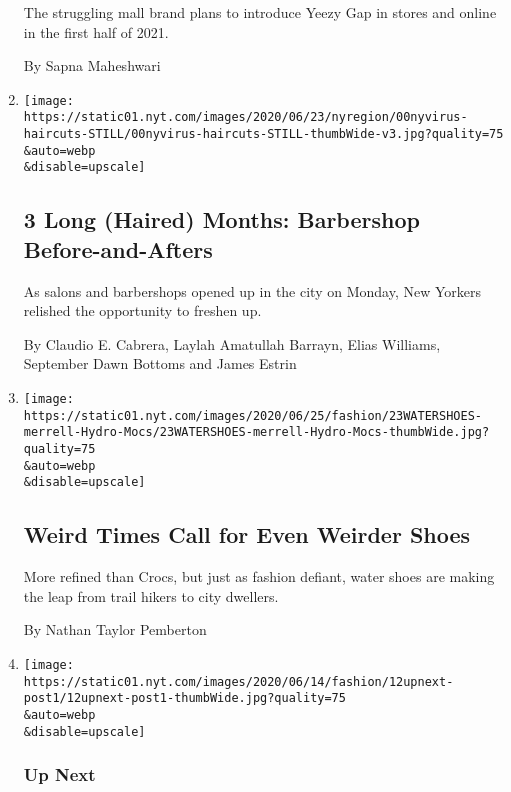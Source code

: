 \begin{enumerate}
  The struggling mall brand plans to introduce Yeezy Gap in stores and
  online in the first half of 2021.

  By Sapna Maheshwari
\item
  \href{/2020/06/25/nyregion/nyc-barber-shops-coronavirus.html}{}

  \texttt{[image: https://static01.nyt.com/images/2020/06/23/nyregion/00nyvirus-haircuts-STILL/00nyvirus-haircuts-STILL-thumbWide-v3.jpg?quality=75\\\&auto=webp\\\&disable=upscale]}

  \hypertarget{3-long-haired-months-barbershop-before-and-afters}{%
  \subsection{3 Long (Haired) Months: Barbershop
  Before-and-Afters}\label{3-long-haired-months-barbershop-before-and-afters}}

  As salons and barbershops opened up in the city on Monday, New Yorkers
  relished the opportunity to freshen up.

  By Claudio E. Cabrera, Laylah Amatullah Barrayn, Elias Williams,
  September Dawn Bottoms and James Estrin
\item
  \href{/2020/06/24/style/weird-times-call-for-even-weirder-shoes.html}{}

  \texttt{[image: https://static01.nyt.com/images/2020/06/25/fashion/23WATERSHOES-merrell-Hydro-Mocs/23WATERSHOES-merrell-Hydro-Mocs-thumbWide.jpg?quality=75\\\&auto=webp\\\&disable=upscale]}

  \hypertarget{weird-times-call-for-even-weirder-shoes}{%
  \subsection{Weird Times Call for Even Weirder
  Shoes}\label{weird-times-call-for-even-weirder-shoes}}

  More refined than Crocs, but just as fashion defiant, water shoes are
  making the leap from trail hikers to city dwellers.

  By Nathan Taylor Pemberton
\item
  \href{/2020/06/12/style/a-street-wear-designer-who-graduated-from-yeezy-university.html}{}

  \texttt{[image: https://static01.nyt.com/images/2020/06/14/fashion/12upnext-post1/12upnext-post1-thumbWide.jpg?quality=75\\\&auto=webp\\\&disable=upscale]}

  \hypertarget{up-next-2}{%
  \subsubsection{Up Next}\label{up-next-2}}


\end{enumerate}
